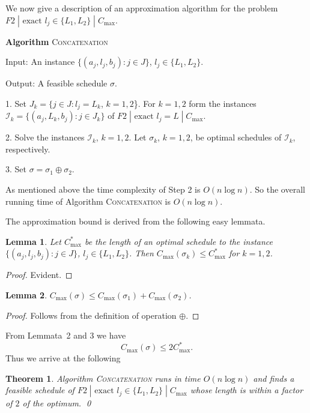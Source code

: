 \documentclass[12pt,a4paper]{article}
\newtheorem{theorem}{Theorem}
\newtheorem{lemma}{Lemma}
\begin{document}
We now give a description of an approximation algorithm for the
problem $F2\;|\mbox{ exact }l_j\in \{L_1,L_2\}\;|\;C_{\max}$.

\medskip

\textbf{Algorithm} \textsc{Concatenation}

\medskip

Input: An instance $\{(a_j,l_j,b_j): j\in J\}$, $l_j\in
\{L_1,L_2\}$.

Output: A feasible schedule $\sigma$.

\medskip

1. Set $J_k=\{j\in J: l_j=L_k$, $k=1,2$\}. For $k=1,2$ form the
instances $\mathcal{I}_k=\{(a_j,L_k, b_j): j\in J_k\}$ of
$F2\;|\mbox{ exact }l_j=L\;|\;C_{\max}$.

2. Solve the instances $\mathcal{I}_k$, $k=1,2$. Let $\sigma_k$,
$k=1,2$, be optimal schedules of $\mathcal{I}_k$, respectively.

3. Set $\sigma=\sigma_1\oplus\sigma_2$.

\medskip

As mentioned above the time complexity of Step 2 is $O(n\log n)$. So
the overall running time of Algorithm \textsc{Concatenation} is
$O(n\log n)$.

The approximation bound is derived from the following easy lemmata.

\begin{lemma}
Let $C^*_{\max}$ be the length of an optimal schedule to the
instance $\{(a_j,l_j,b_j): j\in J\}$, $l_j\in \{L_1,L_2\}$. Then
$C_{\max}(\sigma_k)\leq C^*_{\max}$ for $k=1,2$.
\end{lemma}
\begin{proof} Evident. %
\end{proof}
\begin{lemma}
$C_{\max}(\sigma)\leq C_{\max}(\sigma_1)+C_{\max}(\sigma_2)$.
\end{lemma}
\begin{proof} Follows from the definition of operation $\oplus$.%
\end{proof}
From Lemmata~2 and 3 we have
$$
C_{\max}(\sigma)\leq 2C^*_{\max}.
$$
Thus we arrive at the following
\begin{theorem}
Algorithm \textsc{Concatenation} runs in time $O(n\log n)$ and finds
a feasible schedule of $F2\;|\mbox{ exact }l_j\in
\{L_1,L_2\}\;|\;C_{\max}$ whose length is within a  factor of $2$ of
the optimum. \qed
\end{theorem}

\medskip
\end{document}
